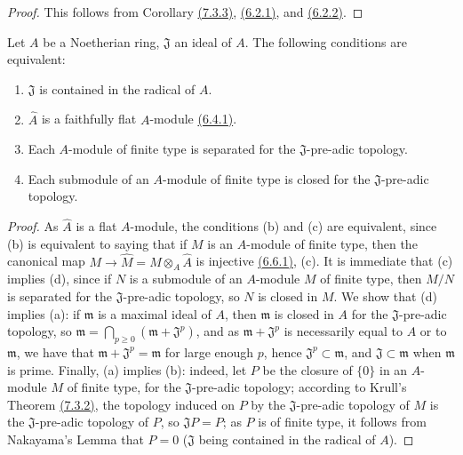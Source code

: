 \begin{proof}
\label{proof-0.7.3.4}
This follows from Corollary \hyperref[0.7.3.3]{(7.3.3)}, \hyperref[0.6.2.1]{(6.2.1)},
and \hyperref[0.6.2.2]{(6.2.2)}.
\end{proof}

\begin{cor}[7.3.5]
\label{0.7.3.5}
Let $A$ be a Noetherian ring, $\mathfrak{J}$ an ideal of $A$. The following conditions are
equivalent:
\begin{enumerate}[label={\rm(\alph*)}]
  \item $\mathfrak{J}$ is contained in the radical of $A$.
  \item $\widehat{A}$ is a faithfully flat $A$-module \hyperref[0.6.4.1]{(6.4.1)}.
  \item Each $A$-module of finite type is separated for the $\mathfrak{J}$-pre-adic topology.
  \item Each submodule of an $A$-module of finite type is closed for the $\mathfrak{J}$-pre-adic topology.
\end{enumerate}
\end{cor}

\begin{proof}
\label{proof-0.7.3.5}
As $\widehat{A}$ is a flat $A$-module, the conditions (b) and (c) are equivalent, since
(b) is equivalent to saying that if $M$ is an $A$-module of finite type, then the canonical
map $M\to\widehat{M}=M\otimes_A\widehat{A}$ is injective \hyperref[0.6.6.1]{(6.6.1)}, (c).
It is immediate that (c) implies (d), since if $N$ is a submodule of an $A$-module $M$ of
finite type, then $M/N$ is separated for the $\mathfrak{J}$-pre-adic topology, so $N$ is
closed in $M$. We show that (d) implies (a): if $\mathfrak{m}$ is a maximal ideal of $A$,
then $\mathfrak{m}$ is closed in $A$ for the $\mathfrak{J}$-pre-adic topology, so
$\mathfrak{m}=\bigcap_{p\geqslant 0}(\mathfrak{m}+\mathfrak{J}^p)$, and as
$\mathfrak{m}+\mathfrak{J}^p$ is necessarily equal to $A$ or to $\mathfrak{m}$, we have that
$\mathfrak{m}+\mathfrak{J}^p=\mathfrak{m}$ for large enough $p$,
hence $\mathfrak{J}^p\subset\mathfrak{m}$, and $\mathfrak{J}\subset\mathfrak{m}$ when
$\mathfrak{m}$ is prime. Finally, (a) implies (b): indeed, let $P$ be the closure of $\{0\}$
in an $A$-module $M$ of finite type, for the $\mathfrak{J}$-pre-adic topology; according to
Krull's Theorem \hyperref[0.7.3.2]{(7.3.2)}, the topology induced on $P$ by the
$\mathfrak{J}$-pre-adic topology of $M$ is the $\mathfrak{J}$-pre-adic topology of $P$,
so $\mathfrak{J}P=P$; as $P$ is of finite type, it follows from Nakayama's Lemma that
$P=0$ ($\mathfrak{J}$ being contained in the radical of $A$).
\end{proof}

